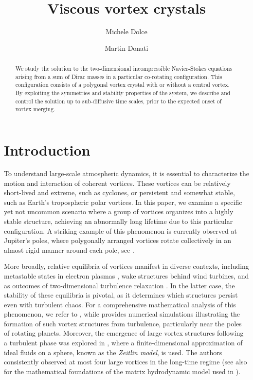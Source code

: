 \documentclass[11pt,reqno,a4paper]{amsart}
\title{Viscous vortex crystals}
\author{Michele Dolce}
\author{Martin Donati}
\newcommand{\1}{\mathbbm{1}}
\theoremstyle{definition}
\theoremstyle{definition}
\numberwithin{equation}{section}
\begin{document}
\begin{abstract}
    We study the solution to the two-dimensional incompressible Navier-Stokes equations arising from a sum of Dirac masses in a particular co-rotating configuration. This configuration consists of a polygonal vortex crystal with or without a central vortex. By exploiting the  symmetries and stability properties of the system, we describe and control the solution up to sub-diffusive time scales, prior to the expected onset of vortex merging.
\end{abstract}

\maketitle

\tableofcontents



\section{Introduction}
To understand large-scale atmospheric dynamics, it is essential to characterize the motion and interaction of  coherent vortices. These vortices can be relatively short-lived and extreme, such as cyclones, or persistent and somewhat stable, such as Earth's tropospheric polar vortices. In this paper, we examine a specific yet not uncommon scenario where a group of vortices organizes into a highly stable structure, achieving an abnormally long lifetime due to this particular configuration. A striking example of this phenomenon is currently observed at Jupiter's poles, where polygonally arranged vortices rotate collectively in an almost rigid manner around each pole, see \cite{Adriani2018Nature}.

More broadly, relative equilibria of vortices manifest in diverse contexts, including metastable states in electron plasmas \cite{schecter1999vortex}, wake structures behind wind turbines, and as outcomes of two-dimensional turbulence relaxation \cite{Fin95}. In the latter case, the stability of these equilibria is pivotal, as it determines which structures persist even with turbulent chaos. For a comprehensive mathematical analysis of this phenomenon, we refer to \cite{Drivas_Elgindi_2023_Singularity}, while \cite{SieYouIng22} provides numerical simulations illustrating the formation of such vortex structures from turbulence, particularly near the poles of rotating planets. Moreover, the emergence of large vortex structures following a turbulent phase was explored in \cite{Modin22}, where a finite-dimensional approximation of ideal fluids on a sphere, known as the \emph{Zeitlin model}, is used. The authors consistently observed at most four large vortices in the long-time regime (see also \cite{Modin26} for the mathematical foundations of the matrix hydrodynamic model used in \cite{Modin22}).
\end{document}
